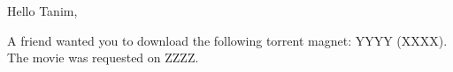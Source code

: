 \documentclass[12pt, fleqn]{article}
\begin{document}
Hello Tanim,

A friend wanted you to download the following torrent magnet: YYYY
(XXXX). The movie was requested on ZZZZ.
\end{document}
